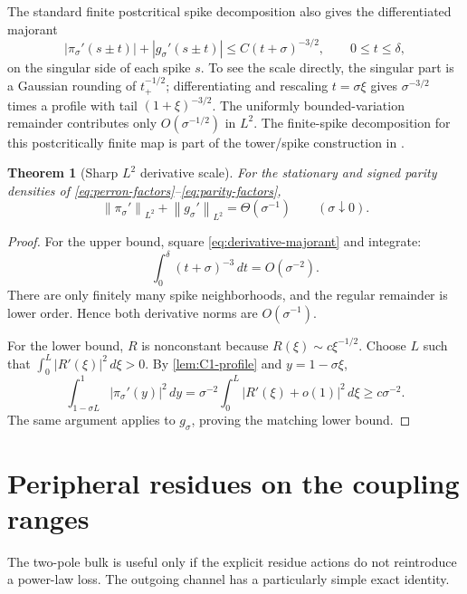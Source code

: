\documentclass[11pt]{article}
\newtheorem{theorem}{Theorem}[section]
\theoremstyle{definition}
\theoremstyle{remark}
\newcommand{\norm}[1]{\left\lVert #1\right\rVert}
\begin{document}
The standard finite postcritical spike decomposition also gives the
differentiated majorant
\begin{equation}
 |\pi_\sigma'(s\pm t)|+|g_\sigma'(s\pm t)|
 \le C(t+\sigma)^{-3/2},
 \qquad 0\le t\le\delta,
 \label{eq:derivative-majorant}
\end{equation}
on the singular side of each spike \(s\).  To see the scale directly, the
singular part is a Gaussian rounding of \(t_+^{-1/2}\); differentiating and
rescaling \(t=\sigma\xi\) gives
\(\sigma^{-3/2}\) times a profile with tail
\((1+\xi)^{-3/2}\).  The uniformly bounded-variation remainder contributes
only \(O(\sigma^{-1/2})\) in \(L^2\).  The finite-spike decomposition for
this postcritically finite map is part of the tower/spike construction in
\citep{Misiurewicz1981,KellerNowicki1992,Baladi2000,
WangBoundaryLayer2026}.

\begin{theorem}[Sharp \(L^2\) derivative scale]
\label{thm:sharp-derivative}
For the stationary and signed parity densities of
\eqref{eq:perron-factors}--\eqref{eq:parity-factors},
\begin{equation}
 \boxed{
 \norm{\pi_\sigma'}_{L^2}
 +\norm{g_\sigma'}_{L^2}
 =\Theta(\sigma^{-1})}
 \qquad(\sigma\downarrow0).
 \label{eq:sharp-derivative}
\end{equation}
\end{theorem}

\begin{proof}
For the upper bound, square \eqref{eq:derivative-majorant} and integrate:
\[
 \int_0^\delta(t+\sigma)^{-3}\,dt
 =O(\sigma^{-2}).
\]
There are only finitely many spike neighborhoods, and the regular remainder
is lower order.  Hence both derivative norms are \(O(\sigma^{-1})\).

For the lower bound, \(R\) is nonconstant because
\(R(\xi)\sim c\xi^{-1/2}\).  Choose \(L\) such that
\(\int_0^L|R'(\xi)|^2\,d\xi>0\).  By
\cref{lem:C1-profile} and \(y=1-\sigma\xi\),
\[
 \int_{1-\sigma L}^{1}|\pi_\sigma'(y)|^2\,dy
 =
 \sigma^{-2}
 \int_0^L|R'(\xi)+o(1)|^2\,d\xi
 \ge c\sigma^{-2}.
\]
The same argument applies to \(g_\sigma\), proving the matching lower
bound.
\end{proof}

\section{Peripheral residues on the coupling ranges}
\label{sec:residues}

The two-pole bulk is useful only if the explicit residue actions do not
reintroduce a power-law loss.  The outgoing channel has a particularly
simple exact identity.
\end{document}
